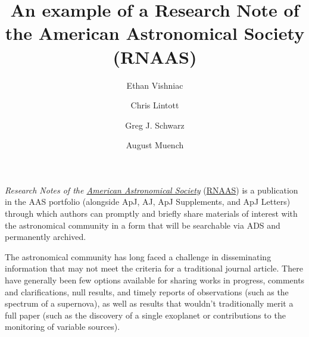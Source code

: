 \documentclass[RNAAS]{aastex62}
\begin{document}
\title{An example of a Research Note of the American Astronomical Society (RNAAS)}


\author{Ethan Vishniac}

\author{Chris Lintott}

\author[0000-0002-0786-7307]{Greg J. Schwarz}

\author{August Muench}


\section{}

\textit{Research Notes of the \href{https://aas.org}{American Astronomical Society}}
(\href{http://rnaas.aas.org}{RNAAS}) is a publication in the AAS portfolio
(alongside ApJ, AJ, ApJ Supplements, and ApJ Letters) through which authors can
promptly and briefly share materials of interest with the astronomical community
in a form that will be searchable via ADS and permanently archived.

The astronomical community has long faced a challenge in disseminating
information that may not meet the criteria for a traditional journal article.
There have generally been few options available for sharing works in progress,
comments and clarifications, null results, and timely reports of observations
(such as the spectrum of a supernova), as well as results that wouldn’t
traditionally merit a full paper (such as the discovery of a single exoplanet
or contributions to the monitoring of variable sources).
\end{document}

